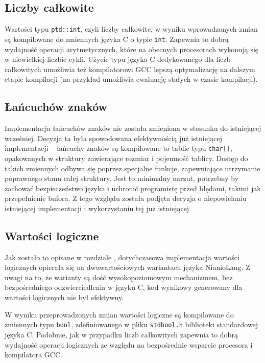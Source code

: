 \documentclass[licencjacka]{pracamgr}
\begin{document}
\subsection{Liczby całkowite}
Wartości typu \texttt{ptd::int}, czyli liczby całkowite, w wyniku wprowadzonych zmian są kompilowane
do zmiennych języka C o typie \texttt{int}. Zapewnia to dobrą wydajność operacji arytmetycznych,
które na obecnych procesorach wykonują się w niewielkiej liczbie cykli. Użycie typu języka C
dedykowanego dla liczb całkowitych umożliwia też kompilatorowi GCC lepszą optymalizację
na dalszym etapie kompilacji (na przykład umożliwia ewaluację stałych w czasie kompilacji).
\subsection{Łańcuchów znaków}
Implementacja łańcuchów znaków nie została zmieniona w stosunku do istniejącej wcześniej.
Decyzja ta była spowodowana efektywnością już istniejącej implementacji -- łańcuchy znaków
są kompilowane to tablic typu \texttt{char[]}, opakowanych w struktury zawierające
rozmiar i pojemność tablicy. Dostęp do takich zmiennych odbywa się poprzez specjalne funkcje,
zapewniające utrzymanie poprawnego stanu całej struktury. Jest to minimalny narzut, potrzebny by
zachować bezpieczeństwo języka i uchronić programistę przed błędami, takimi jak przepełnienie bufora.
Z tego względu została podjęta decyzja o niepowielaniu istniejącej implementacji i wykorzystaniu
tej już istniejącej.
\subsection{Wartości logiczne}
Jak zostało to opisane w rozdziale \textit{}, dotychczasowa implementacja
wartości logicznych opierała się na dwuwartościowych wariantach
języka NianioLang. Z uwagi na to, że warianty są dość wysokopoziomowym mechanizmem, bez
bezpośredniego odzwierciedlenia w języku C, kod wynikowy generowany dla wartości logicznych nie był
efektywny.

W wyniku przeprowadzonych zmian wartości logiczne są kompilowane do zmiennych typu \texttt{bool},
zdefiniowanego w pliku \texttt{stdbool.h} biblioteki standardowej języka C.
Podobnie, jak w przypadku liczb całkowitych zapewnia to dobrą wydajność operacji logicznych
ze względu na bezpośrednie wsparcie procesora i kompilatora GCC.
\end{document}
